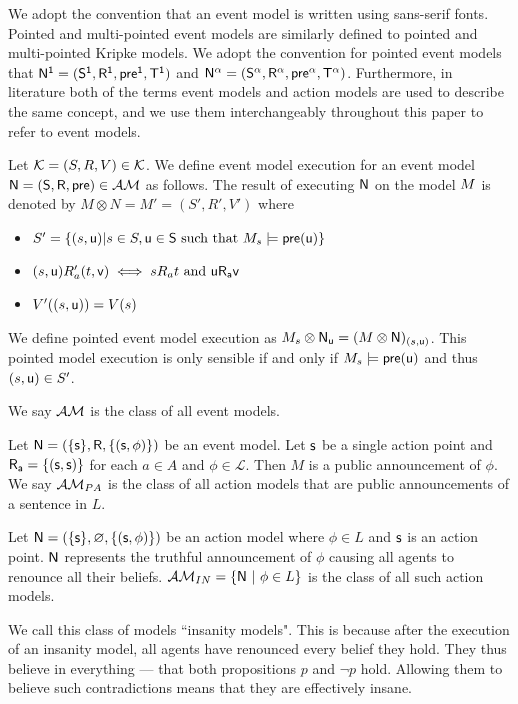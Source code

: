 We adopt the convention that an event model is written using sans-serif fonts.
Pointed and multi-pointed event models are similarly defined to pointed and multi-pointed Kripke
models.
We adopt the convention for pointed event models that $\mathrm{\mathsf{\mathrm{\mathsf{N}}^1 = (S^1, R^1,
pre^1, T^1)}}$ and $\mathrm{\mathsf{\mathrm{\mathsf{N}}^\alpha =
  (S^\alpha,R^\alpha,pre^\alpha,T^\alpha)}}$.
Furthermore, in literature both of the terms event models and action models are used to describe
the same concept, and we use them interchangeably throughout this paper to refer to event models.

\begin{defn} \label{evModelEx}
Let $\mathcal{K} = (S, R, V) \in \mathcal{K}$. We define event model
execution for an event model $\mathrm{\mathsf{\mathrm{\mathsf{N}} = (S,
		R, pre)}} \in
\mathcal{AM}$ as follows.
The result of executing $\mathrm{\mathsf{N}}$ on the model $M$ is denoted by $M \otimes N = M' = (S', R', V')$ where
\begin{itemize}
	\item $S' = \{(s,\mathrm{\mathsf{u}}) | s \in S, \mathrm{\mathsf{u \in
    S}} \text{ such that } M_s \models \mathrm{\mathsf{pre(u)}}\}$
	\item $(s, \mathrm{\mathsf{u}}) R_a' (t, \mathrm{\mathsf{v}}) \iff s R_a t \text{ and } \mathrm{\mathsf{u R_a v}}$
	\item $V'((s,\mathrm{\mathsf{u}})) = V(s)$
\end{itemize}
We define pointed event model execution as $M_s \otimes
\mathrm{\mathsf{\mathrm{\mathsf{N}}_u}}
= (M \otimes \mathrm{\mathsf{\mathrm{\mathsf{N}}}})_{(s, \mathrm{\mathsf{u}})}$.
This pointed model execution is only sensible if and only if $M_s \models
\mathrm{\mathsf{pre(u)}}$ and thus $(s,\mathrm{\mathsf{u}})
	\in S'$.
\end{defn}

We say $\mathcal{AM}$ is the class of all event models.

\begin{defn} \label{pub}
Let $\mathrm{\mathsf{\mathrm{\mathsf{N}} = (\{ s \}, R, \{ (s, \phi)\}}})$ be an event model.
Let $\mathrm{\mathsf{s}}$ be a single action point and $\mathrm{\mathsf{R_a =
  \{(s, s)\}}}$ for each $a \in A$ and $\phi
\in \mathcal{L}$.
Then $M$ is a public announcement of $\phi$.
We say $\mathcal{AM}_{PA}$ is the class of all action models that
are public announcements of a sentence in $L$.
\end{defn}

\begin{defn} \label{insanity}
Let $\mathrm{\mathsf{\mathrm{\mathsf{N}} = (\{ s \}, \varnothing, \{(s, \phi)\})}}$ be an action model
where $\phi \in L$ and $\mathrm{\mathsf{s}}$ is an action point.
$\mathrm{\mathsf{\mathrm{\mathsf{N}}}}$ represents the truthful announcement of $\phi$ causing all agents to renounce all their beliefs.
$\mathcal{AM}_{IN} = \{\mathrm{\mathsf{\mathrm{\mathsf{N}}}} \text{ } | \text{ } \phi \in L\}$ is the class of all such action models.
\end{defn}
We call this class of models ``insanity models".
This is because after the execution of an insanity model, all agents have renounced every belief
they hold.
They thus believe in everything --- that both propositions $p$ and $\neg p$ hold.
Allowing them to believe such contradictions means that they are effectively insane.

